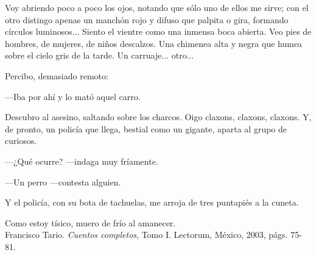 \documentclass[14pt,a5paper,oneside,final]{extbook}
\begin{document}
Voy abriendo poco a poco los ojos, notando que sólo uno de ellos me sirve; con el otro distingo apenas un manchón rojo y difuso que palpita o gira, formando círculos luminosos... Siento el vientre como una inmensa boca abierta. Veo pies de hombres, de mujeres, de niños descalzos. Una chimenea alta y negra que humea sobre el cielo gris de la tarde. Un carruaje... otro...

Percibo, demasiado remoto:

---Iba por ahí y lo mató aquel carro.

Descubro al asesino, saltando sobre los charcos. Oigo claxons, claxons, claxons. Y, de pronto, un policía que llega, bestial como un gigante, aparta al grupo de curiosos.

---¿Qué ocurre? ---indaga muy fríamente.

---Un perro ---contesta alguien.

Y el policía, con su bota de tachuelas, me arroja de tres puntapiés a la cuneta.

Como estoy tísico, muero de frío al amanecer. \\

\noindent Francisco Tario. \emph{Cuentos completos}, Tomo I. Lectorum, México, 2003, págs. 75-81. \\

\vfill

\begin{footnotesize}
\end{footnotesize}
\end{document}
